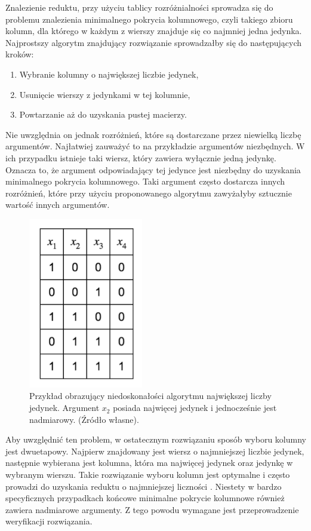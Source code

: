 Znalezienie reduktu,
przy użyciu tablicy rozróżnialności sprowadza się do problemu znalezienia minimalnego pokrycia kolumnowego,
czyli takiego zbioru kolumn,
dla którego w każdym z wierszy znajduje się co najmniej jedna jedynka.
Najprostszy algorytm znajdujący rozwiązanie sprowadzałby się do następujących kroków:
\begin{enumerate}
\item Wybranie kolumny o największej liczbie jedynek,
\item Usunięcie wierszy z jedynkami w tej kolumnie,
\item Powtarzanie aż do uzyskania pustej macierzy.
\end{enumerate}
Nie uwzględnia on jednak rozróżnień,
które są dostarczane przez niewielką liczbę argumentów.
Najłatwiej zauważyć to na przykładzie argumentów niezbędnych.
W ich przypadku istnieje taki wiersz,
który zawiera wyłącznie jedną jedynkę.
Oznacza to,
że argument odpowiadający tej jedynce jest niezbędny do uzyskania minimalnego pokrycia kolumnowego.
Taki argument często dostarcza innych rozróżnień,
które przy użyciu proponowanego algorytmu zawyżałyby sztucznie wartość innych argumentów.

\begin{figure}[H]
\centering
\includegraphics[width = 5cm]{chapter02/required-arguments.png}
\caption{Przykład obrazujący niedoskonałości algorytmu największej liczby jedynek. Argument $x_2$ posiada najwięcej jedynek i jednocześnie jest nadmiarowy. (Źródło własne).}
\end{figure}

Aby uwzględnić ten problem,
w ostatecznym rozwiązaniu sposób wyboru kolumny jest dwuetapowy.
Najpierw znajdowany jest wiersz o najmniejszej liczbie jedynek,
następnie wybierana jest kolumna,
która ma najwięcej jedynek oraz jedynkę w wybranym wierszu.
Takie rozwiązanie wyboru kolumn jest optymalne i często prowadzi do uzyskania reduktu o najmniejszej liczności \cite{unate-artykul}.
Niestety w bardzo specyficznych przypadkach końcowe minimalne pokrycie kolumnowe również zawiera nadmiarowe argumenty.
Z tego powodu wymagane jest przeprowadzenie weryfikacji rozwiązania.


